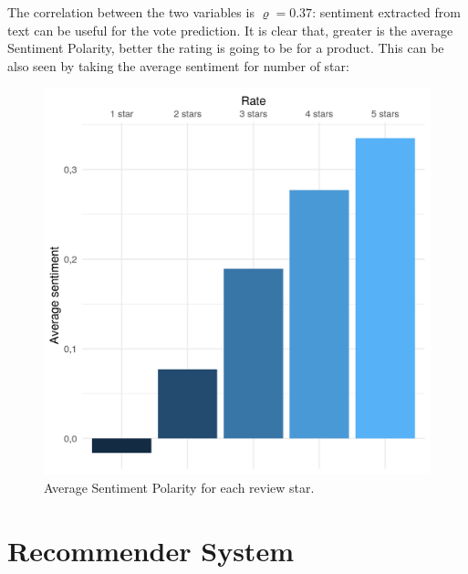 \documentclass[fleqn,10pt]{SelfArx}
\begin{document}
The correlation between the two variables is $\varrho = 0.37$: sentiment extracted from text can be useful for the vote prediction. 
It is clear that, greater is the average Sentiment Polarity, better the rating is going to be for a product.
This can be also seen by taking the average sentiment for number of star:
\begin{figure}[!h]
    \includegraphics[width=\linewidth]{sentiment.png}
    \caption{Average Sentiment Polarity for each review star.}
    \label{fig:sentiment}
\end{figure}

\newpage
\part{Recommender System}
\end{document}

